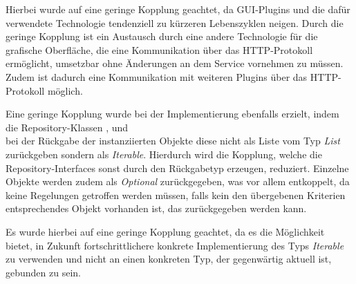 Hierbei wurde auf eine geringe Kopplung geachtet, da \ac{GUI}-Plugins und die dafür verwendete Technologie tendenziell zu kürzeren Lebenszyklen neigen.
Durch die geringe Kopplung ist ein Austausch durch eine andere Technologie für die grafische Oberfläche, die eine Kommunikation über das \ac{HTTP}-Protokoll ermöglicht, umsetzbar ohne Änderungen an dem Service vornehmen zu müssen.
Zudem ist dadurch eine Kommunikation mit weiteren Plugins über das \ac{HTTP}-Protokoll möglich.

Eine geringe Kopplung wurde bei der Implementierung ebenfalls erzielt, indem die Repository-Klassen \href{https://github.com/lucasmerkel/dhbw-advancedswe-programmentwurf/blob/5764d7da4cfd0562ed8e96128e92f85c30b7309d/swe_programmentwurf/consumergoods-inventory-planner/3-cip-domain/src/main/java/de/dhbw/cip/domain/ConsumerGoodsRepository.java}{}, \href{https://github.com/lucasmerkel/dhbw-advancedswe-programmentwurf/blob/5764d7da4cfd0562ed8e96128e92f85c30b7309d/swe_programmentwurf/consumergoods-inventory-planner/3-cip-domain/src/main/java/de/dhbw/cip/domain/FridgeRepository.java}{} und \\\href{https://github.com/lucasmerkel/dhbw-advancedswe-programmentwurf/blob/5764d7da4cfd0562ed8e96128e92f85c30b7309d/swe_programmentwurf/consumergoods-inventory-planner/3-cip-domain/src/main/java/de/dhbw/cip/domain/FoodShelfRepository.java}{} bei der Rückgabe der instanziierten Objekte diese nicht als Liste vom Typ \textit{List} zurückgeben sondern als \textit{Iterable}.
Hierdurch wird die Kopplung, welche die Repository-Interfaces sonst durch den Rückgabetyp erzeugen, reduziert.
Einzelne Objekte werden zudem als \textit{Optional} zurückgegeben, was vor allem entkoppelt, da keine Regelungen getroffen werden müssen, falls kein den übergebenen Kriterien entsprechendes Objekt vorhanden ist, das zurückgegeben werden kann.

Es wurde hierbei auf eine geringe Kopplung geachtet, da es die Möglichkeit bietet, in Zukunft fortschrittlichere konkrete Implementierung des Typs \textit{Iterable} zu verwenden und nicht an einen konkreten Typ, der gegenwärtig aktuell ist, gebunden zu sein.

